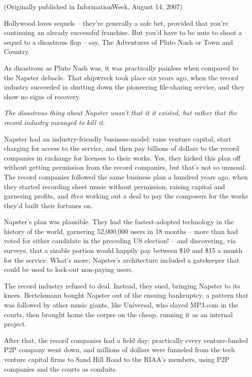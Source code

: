 (Originally published in InformationWeek, August 14, 2007)

Hollywood loves sequels -- they're generally a safe bet, provided
that you're continuing an already successful franchise. But you'd
have to be nuts to shoot a sequel to a disastrous flop -- say, The
Adventures of Pluto Nash or Town and Country.

As disastrous as Pluto Nash was, it was practically painless when
compared to the Napster debacle. That shipwreck took place six
years ago, when the record industry succeeded in shutting down the
pioneering file-sharing service, and they show no signs of
recovery.

\emph{The disastrous thing about Napster wasn't that it it existed, but rather that the record industry managed to kill it.}

Napster had an industry-friendly business-model: raise venture
capital, start charging for access to the service, and then pay
billions of dollars to the record companies in exchange for
licenses to their works. Yes, they kicked this plan off without
getting permission from the record companies, but that's not so
unusual. The record companies followed the same business plan a
hundred years ago, when they started recording sheet music without
permission, raising capital and garnering profits, and
\emph{then} working out a deal to pay the composers for the works
they'd built their fortunes on.

Napster's plan was plausible. They had the fastest-adopted
technology in the history of the world, garnering 52,000,000 users
in 18 months -- more than had voted for either candidate in the
preceding US election! -- and discovering, via surveys, that a
sizable portion would happily pay between \$10 and \$15 a month for
the service. What's more, Napster's architecture included a
gatekeeper that could be used to lock-out non-paying users.

The record industry refused to deal. Instead, they sued, bringing
Napster to its knees. Bertelsmann bought Napster out of the ensuing
bankruptcy, a pattern that was followed by other music giants, like
Universal, who slayed MP3.com in the courts, then brought home the
corpse on the cheap, running it as an internal project.

After that, the record companies had a field day: practically every
venture-funded P2P company went down, and millions of dollars were
funneled from the tech venture capital firms to Sand Hill Road to
the RIAA's members, using P2P companies and the courts as
conduits.

